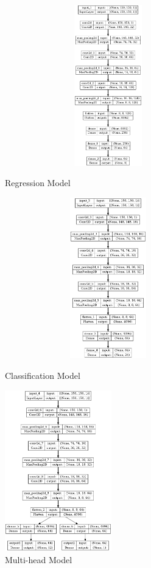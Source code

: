 \documentclass{article}
\begin{document}
\begin{figure}[!h]
	\centering
	\begin{minipage}[t]{0.32\textwidth}%
		\centering
		\includegraphics[width=0.8\textwidth, height=7cm]{./fig/reg_model.png}
		\caption{Regression Model}
		\label{fig:regression}
	\end{minipage}
	\begin{minipage}[t]{0.32\textwidth}%
		\centering
		\includegraphics[width=0.8\textwidth, height=7cm]{./fig/class_model.png}
		\caption{Classification Model}
		\label{fig:classification}
	\end{minipage}
	\begin{minipage}[t]{0.32\textwidth}%
		\centering
		\includegraphics[width=\textwidth, height=7cm]{./fig/multi_model.png}
		\caption{Multi-head Model}
		\label{fig:multi-head}
	\end{minipage}
\end{figure}
\end{document}
